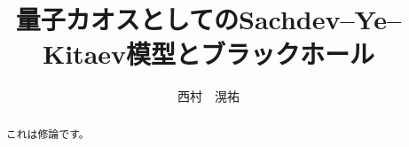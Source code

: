 \title{量子カオスとしてのSachdev--Ye--Kitaev模型とブラックホール}
\author{西村　滉祐}
\date{}
\maketitle

\begin{abstract}
	これは修論です。
\end{abstract}

\thispagestyle{empty}
\pagebreak

